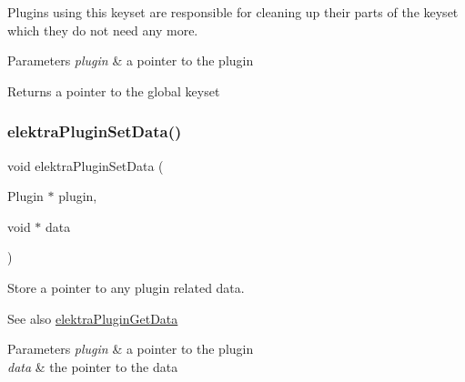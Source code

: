 Plugins using this keyset are responsible for cleaning up their parts of the keyset which they do not need any more.


\begin{DoxyParams}{Parameters}
{\em plugin} & a pointer to the plugin \\
\hline
\end{DoxyParams}
\begin{DoxyReturn}{Returns}
a pointer to the global keyset 
\end{DoxyReturn}
\mbox{\label{group__plugin_gaf4b941a52ff55d0ca2a9158d90208ef2}} 
\subsubsection{\texorpdfstring{elektraPluginSetData()}{elektraPluginSetData()}}
{\footnotesize\ttfamily void elektra\+Plugin\+Set\+Data (\begin{DoxyParamCaption}\item[{Plugin $\ast$}]{plugin,  }\item[{void $\ast$}]{data }\end{DoxyParamCaption})}



Store a pointer to any plugin related data. 

\begin{DoxySeeAlso}{See also}
\mbox{\hyperlink{group__plugin_gaafcf3216b46292f222b8cc7828b4dd20}{elektra\+Plugin\+Get\+Data}} 
\end{DoxySeeAlso}

\begin{DoxyParams}{Parameters}
{\em plugin} & a pointer to the plugin \\
\hline
{\em data} & the pointer to the data \\
\hline
\end{DoxyParams}
